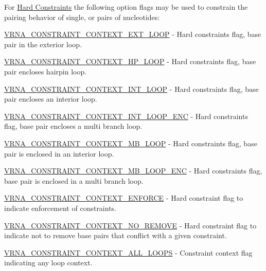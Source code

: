 For \hyperlink{group__hard__constraints}{Hard Constraints} the following option flags may be used to constrain the pairing behavior of single, or pairs of nucleotides\+:


\begin{DoxyItemize}
\item \hyperlink{group__hard__constraints_ga9418eda62a5dec070896702c279d2548}{V\+R\+N\+A\+\_\+\+C\+O\+N\+S\+T\+R\+A\+I\+N\+T\+\_\+\+C\+O\+N\+T\+E\+X\+T\+\_\+\+E\+X\+T\+\_\+\+L\+O\+OP} -\/ Hard constraints flag, base pair in the exterior loop.
\item \hyperlink{group__hard__constraints_ga79203702b197b6b9d3b78eed40663eb1}{V\+R\+N\+A\+\_\+\+C\+O\+N\+S\+T\+R\+A\+I\+N\+T\+\_\+\+C\+O\+N\+T\+E\+X\+T\+\_\+\+H\+P\+\_\+\+L\+O\+OP} -\/ Hard constraints flag, base pair encloses hairpin loop.
\item \hyperlink{group__hard__constraints_ga21feeab3a9e5fa5a9e3d9ac0fcf5994f}{V\+R\+N\+A\+\_\+\+C\+O\+N\+S\+T\+R\+A\+I\+N\+T\+\_\+\+C\+O\+N\+T\+E\+X\+T\+\_\+\+I\+N\+T\+\_\+\+L\+O\+OP} -\/ Hard constraints flag, base pair encloses an interior loop.
\item \hyperlink{group__hard__constraints_ga0536288e04ff6332ecdc23ca4705402b}{V\+R\+N\+A\+\_\+\+C\+O\+N\+S\+T\+R\+A\+I\+N\+T\+\_\+\+C\+O\+N\+T\+E\+X\+T\+\_\+\+I\+N\+T\+\_\+\+L\+O\+O\+P\+\_\+\+E\+NC} -\/ Hard constraints flag, base pair encloses a multi branch loop.
\item \hyperlink{group__hard__constraints_ga456ecd2ff00056bb64da8dd4f61bbfc5}{V\+R\+N\+A\+\_\+\+C\+O\+N\+S\+T\+R\+A\+I\+N\+T\+\_\+\+C\+O\+N\+T\+E\+X\+T\+\_\+\+M\+B\+\_\+\+L\+O\+OP} -\/ Hard constraints flag, base pair is enclosed in an interior loop.
\item \hyperlink{group__hard__constraints_ga02a3d703ddbcfce393e4bbfcb9db7077}{V\+R\+N\+A\+\_\+\+C\+O\+N\+S\+T\+R\+A\+I\+N\+T\+\_\+\+C\+O\+N\+T\+E\+X\+T\+\_\+\+M\+B\+\_\+\+L\+O\+O\+P\+\_\+\+E\+NC} -\/ Hard constraints flag, base pair is enclosed in a multi branch loop.
\item \hyperlink{hard_8h_a1aa55f2c6347e670e003b1a765632dad}{V\+R\+N\+A\+\_\+\+C\+O\+N\+S\+T\+R\+A\+I\+N\+T\+\_\+\+C\+O\+N\+T\+E\+X\+T\+\_\+\+E\+N\+F\+O\+R\+CE} -\/ Hard constraint flag to indicate enforcement of constraints.
\item \hyperlink{hard_8h_a9fcac36535850ff612c7e6b1305304a1}{V\+R\+N\+A\+\_\+\+C\+O\+N\+S\+T\+R\+A\+I\+N\+T\+\_\+\+C\+O\+N\+T\+E\+X\+T\+\_\+\+N\+O\+\_\+\+R\+E\+M\+O\+VE} -\/ Hard constraint flag to indicate not to remove base pairs that conflict with a given constraint.
\item \hyperlink{group__hard__constraints_ga886d9127c49bb982a4b67cd7581e8a5a}{V\+R\+N\+A\+\_\+\+C\+O\+N\+S\+T\+R\+A\+I\+N\+T\+\_\+\+C\+O\+N\+T\+E\+X\+T\+\_\+\+A\+L\+L\+\_\+\+L\+O\+O\+PS} -\/ Constraint context flag indicating any loop context.
\end{DoxyItemize}

